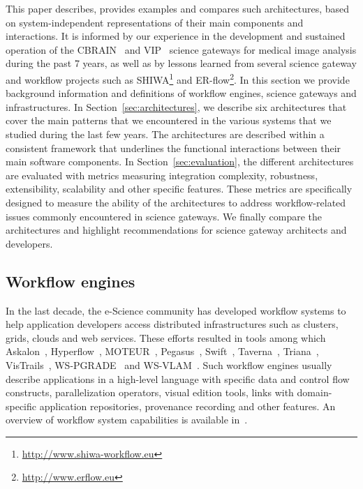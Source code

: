 \documentclass[preprint,3p,twocolumn]{elsarticle}
\begin{document}
This paper describes, provides examples and compares such
architectures, based on system-independent representations of their
main components and interactions. It is informed
 by our experience in the development and
sustained operation of the CBRAIN~\cite{SHER-14} and
VIP~\cite{GLAT-13} science gateways for medical image analysis during
the past 7 years, as well as by lessons learned from several science
gateway and workflow projects such as
SHIWA\footnote{\url{http://www.shiwa-workflow.eu}} and
ER-flow\footnote{\url{http://www.erflow.eu}}.  In this section we
provide background information and definitions of workflow engines,
science gateways and infrastructures. In
Section~\ref{sec:architectures}, we describe six architectures
 that cover
the main patterns that we encountered in the various systems that we
studied during the last few years. The architectures are described
within a consistent framework that underlines the functional
interactions between their main software components. In
Section~\ref{sec:evaluation}, the different architectures are
evaluated with metrics measuring integration complexity, robustness,
extensibility, scalability and other specific features. These metrics
are specifically designed to measure the ability of the architectures
to address workflow-related issues commonly encountered in science
gateways. We finally compare the architectures and highlight
recommendations for science gateway architects and 
developers.

\subsection{Workflow engines}

\label{sec:introduction-engines}
In the last decade, the e-Science community has developed workflow
systems to help application developers access distributed
infrastructures such as clusters, grids, clouds and web
services. These efforts resulted in tools among which
Askalon~\cite{fahringer2005askalon},
Hyperflow~\cite{balis2016hyperflow}, MOTEUR~\cite{GLAT-08i},
Pegasus~\cite{deelman2005pegasus,Deelman201517},
Swift~\cite{zhao2007swift}, Taverna~\cite{oinn2004taverna},
Triana~\cite{taylor2007triana}, VisTrails~\cite{callahan2006managing},
WS-PGRADE~\cite{Kacsuk2012} and
WS-VLAM~\cite{wsvlam}.  Such workflow engines usually describe
applications in a high-level language with specific data and control
flow constructs, parallelization operators, visual edition tools,
links with domain-specific application repositories, provenance
recording and other features. An overview of workflow system
capabilities is available in~\cite{deelman2009workflows}.
\end{document}
